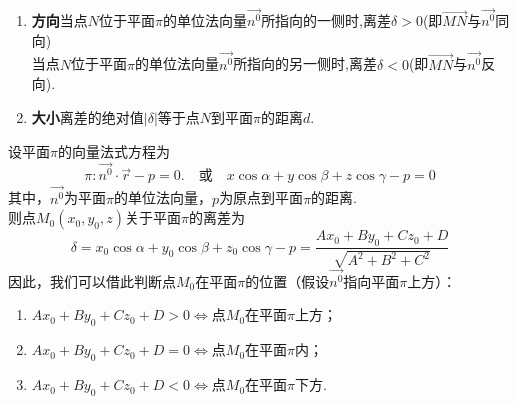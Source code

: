 \begin{enumerate}
	\item {\color{dy}\textbf{方向}}\quad 当点$N$位于平面$\pi $的单位法向量$\overrightarrow{n^0}$所指向的一侧时,离差$\delta >0$(即$\overrightarrow{MN}$与$\overrightarrow{n^0}$同向)\\
	当点$N$位于平面$\pi $的单位法向量$\overrightarrow{n^0}$所指向的另一侧时,离差$\delta <0$(即$\overrightarrow{MN}$与$\overrightarrow{n^0}$反向).
	\item {\color{dy}\textbf{大小}}\quad 离差的绝对值$|\delta| $等于点$N$到平面$\pi $的距离$d$.
\end{enumerate}
\theorem[点与平面的位置关系]
\quad 设平面$\pi $的向量法式方程为
\begin{equation*}
\pi :\overrightarrow{n^0}\cdot \overrightarrow{r}-p=0.\quad \mbox{或} \quad  x\cos \alpha+y\cos \beta +z\cos \gamma-p=0 
\end{equation*}
其中，$\overrightarrow{n^0}$为平面$\pi $的单位法向量，$p$为原点到平面$\pi $的距离.\\
\quad 则点$M_0(x_0,y_0,z)$关于平面$\pi $的离差为
\begin{equation}
\delta =x_0\cos \alpha+y_0\cos \beta +z_0\cos \gamma-p=\frac{Ax_0+By_0+Cz_0+D}{\sqrt{A^2+B^2+C^2}}
\end{equation}
因此，我们可以借此判断点$M_0$在平面$\pi $的位置（假设$\overrightarrow{n^0}$指向平面$\pi $上方）：
\begin{enumerate}[$\mathrm (1)$]
	\setlength{\itemindent}{3em}
	\setlength{\topsep}{0.01em}
	\setlength{\itemsep}{0.01em}
	\item $Ax_0+By_0+Cz_0+D>0 \Longleftrightarrow $点$M_0$在平面$\pi $上方；
	\item $Ax_0+By_0+Cz_0+D=0 \Longleftrightarrow $点$M_0$在平面$\pi $内；
	\item $Ax_0+By_0+Cz_0+D<0 \Longleftrightarrow $点$M_0$在平面$\pi $下方.
\end{enumerate}



